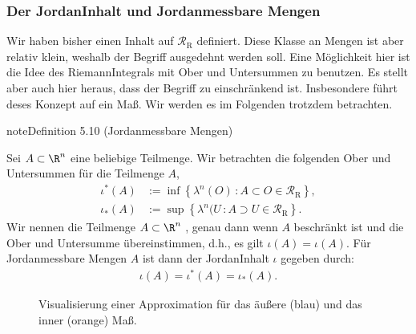 \documentclass[letterpaper,10pt,english]{jupyterBook}
\let\sphinxpxdimen\pdfpxdimen\else\newdimen\sphinxpxdimen
\begin{document}
\subsubsection{Der Jordan\sphinxhyphen{}Inhalt und Jordan\sphinxhyphen{}messbare Mengen}
\label{\detokenize{masstheorie/masstheorie:der-jordan-inhalt-und-jordan-messbare-mengen}}
\sphinxAtStartPar
Wir haben bisher einen Inhalt auf \(\mathcal{R}_{\text{R}}\) definiert. Diese Klasse an Mengen ist aber relativ klein, weshalb der Begriff ausgedehnt werden soll. Eine Möglichkeit hier ist die Idee des Riemann\sphinxhyphen{}Integrals mit Ober\sphinxhyphen{} und Untersummen zu benutzen. Es stellt aber auch hier heraus, dass der Begriff zu einschränkend ist. Insbesondere führt deses Konzept  auf ein Maß. Wir werden es im Folgenden trotzdem betrachten.
\label{masstheorie/masstheorie:definition-18}
\begin{sphinxadmonition}{note}{Definition 5.10 (Jordan\sphinxhyphen{}messbare Mengen)}



\sphinxAtStartPar
Sei \(A \subset \R^n\) eine beliebige Teilmenge.
Wir betrachten die folgenden  Ober\sphinxhyphen{} und Untersummen für die Teilmenge \(A\),
\begin{equation*}
\begin{split}\iota^\ast(A) &:= \inf \left\{ \lambda^n(O) \, : A \subset O \in\mathcal{R}_{\text{R}}\right\},\\
\iota_\ast(A) &:= \sup \left\{ \lambda^n(U \, : A \supset U\in\mathcal{R}_{\text{R}} \right\}.\end{split}
\end{equation*}
\sphinxAtStartPar
Wir nennen die Teilmenge \(A \subset \R^n\) , genau dann wenn \(A\) beschränkt ist und die Ober\sphinxhyphen{} und Untersumme übereinstimmen, d.h., es gilt \(\iota(A) = \iota(A)\).
Für Jordan\sphinxhyphen{}messbare Mengen \(A\) ist dann der Jordan\sphinxhyphen{}Inhalt \(\iota\) gegeben durch:
\begin{equation*}
\begin{split}\iota(A) = \iota^\ast(A) = \iota_\ast(A).\end{split}
\end{equation*}\end{sphinxadmonition}

\begin{figure}[htbp]
\centering
\capstart

\noindent\sphinxincludegraphics[width=400\sphinxpxdimen]{{jordanmeasure}.jpg}
\caption{Visualisierung einer Approximation für das äußere (blau) und das inner (orange) Maß.}\label{\detokenize{masstheorie/masstheorie:id1}}\end{figure}
\end{document}
